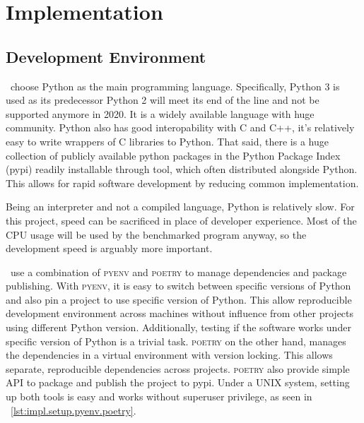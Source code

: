 \section{Implementation}
\label{sec:impl.impl}


\subsection{Development Environment}

\First~choose Python as the main programming language.
Specifically, Python 3 is used as its predecessor Python 2 will meet its end of the line and not be supported anymore in 2020.
It is a widely available language with huge community.
Python also has good interopability with C and C++, it's relatively easy to write wrappers of C libraries to Python.
That said, there is a huge collection of publicly available python packages in the Python Package Index (pypi) readily installable through  tool, which often distributed alongside Python.
This allows for rapid software development by reducing common implementation.

Being an interpreter and not a compiled language, Python is relatively slow.
For this project, speed can be sacrificed in place of developer experience.
Most of the CPU usage will be used by the benchmarked program anyway, so the development speed is arguably more important.

\First~use a combination of \textsc{pyenv} and \textsc{poetry} to manage dependencies and package publishing.
With \textsc{pyenv}, it is easy to switch between specific versions of Python and also pin a project to use specific version of Python.
This allow reproducible development environment across machines without influence from other projects using different Python version.
Additionally, testing if the software works under specific version of Python is a trivial task.
\textsc{poetry} on the other hand, manages the dependencies in a virtual environment with version locking.
This allows separate, reproducible dependencies across projects.
\textsc{poetry} also provide simple API to package and publish the project to pypi.
Under a UNIX system, setting up both tools is easy and works without superuser privilege, as seen in \lst~\ref{lst:impl.setup.pyenv.poetry}.

